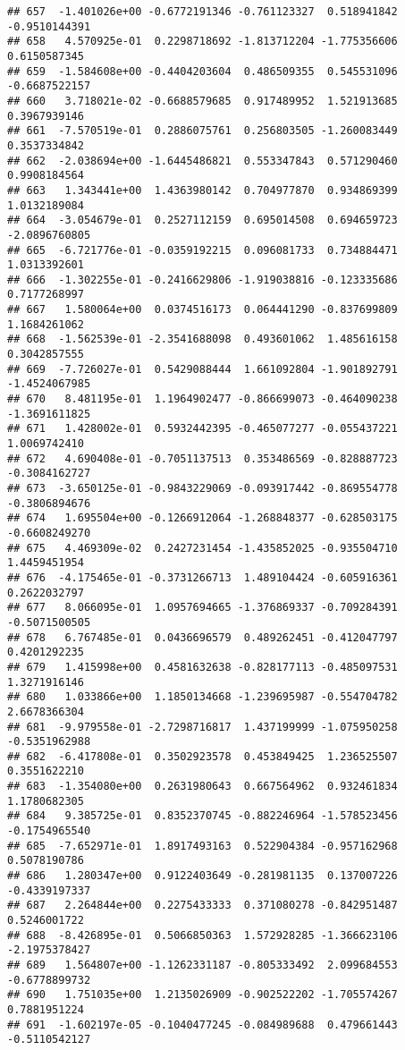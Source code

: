 \documentclass[
]{article}
\begin{document}
\begin{verbatim}
## 657  -1.401026e+00 -0.6772191346 -0.761123327  0.518941842 -0.9510144391
## 658   4.570925e-01  0.2298718692 -1.813712204 -1.775356606  0.6150587345
## 659  -1.584608e+00 -0.4404203604  0.486509355  0.545531096 -0.6687522157
## 660   3.718021e-02 -0.6688579685  0.917489952  1.521913685  0.3967939146
## 661  -7.570519e-01  0.2886075761  0.256803505 -1.260083449  0.3537334842
## 662  -2.038694e+00 -1.6445486821  0.553347843  0.571290460  0.9908184564
## 663   1.343441e+00  1.4363980142  0.704977870  0.934869399  1.0132189084
## 664  -3.054679e-01  0.2527112159  0.695014508  0.694659723 -2.0896760805
## 665  -6.721776e-01 -0.0359192215  0.096081733  0.734884471  1.0313392601
## 666  -1.302255e-01 -0.2416629806 -1.919038816 -0.123335686  0.7177268997
## 667   1.580064e+00  0.0374516173  0.064441290 -0.837699809  1.1684261062
## 668  -1.562539e-01 -2.3541688098  0.493601062  1.485616158  0.3042857555
## 669  -7.726027e-01  0.5429088444  1.661092804 -1.901892791 -1.4524067985
## 670   8.481195e-01  1.1964902477 -0.866699073 -0.464090238 -1.3691611825
## 671   1.428002e-01  0.5932442395 -0.465077277 -0.055437221  1.0069742410
## 672   4.690408e-01 -0.7051137513  0.353486569 -0.828887723 -0.3084162727
## 673  -3.650125e-01 -0.9843229069 -0.093917442 -0.869554778 -0.3806894676
## 674   1.695504e+00 -0.1266912064 -1.268848377 -0.628503175 -0.6608249270
## 675   4.469309e-02  0.2427231454 -1.435852025 -0.935504710  1.4459451954
## 676  -4.175465e-01 -0.3731266713  1.489104424 -0.605916361  0.2622032797
## 677   8.066095e-01  1.0957694665 -1.376869337 -0.709284391 -0.5071500505
## 678   6.767485e-01  0.0436696579  0.489262451 -0.412047797  0.4201292235
## 679   1.415998e+00  0.4581632638 -0.828177113 -0.485097531  1.3271916146
## 680   1.033866e+00  1.1850134668 -1.239695987 -0.554704782  2.6678366304
## 681  -9.979558e-01 -2.7298716817  1.437199999 -1.075950258 -0.5351962988
## 682  -6.417808e-01  0.3502923578  0.453849425  1.236525507  0.3551622210
## 683  -1.354080e+00  0.2631980643  0.667564962  0.932461834  1.1780682305
## 684   9.385725e-01  0.8352370745 -0.882246964 -1.578523456 -0.1754965540
## 685  -7.652971e-01  1.8917493163  0.522904384 -0.957162968  0.5078190786
## 686   1.280347e+00  0.9122403649 -0.281981135  0.137007226 -0.4339197337
## 687   2.264844e+00  0.2275433333  0.371080278 -0.842951487  0.5246001722
## 688  -8.426895e-01  0.5066850363  1.572928285 -1.366623106 -2.1975378427
## 689   1.564807e+00 -1.1262331187 -0.805333492  2.099684553 -0.6778899732
## 690   1.751035e+00  1.2135026909 -0.902522202 -1.705574267  0.7881951224
## 691  -1.602197e-05 -0.1040477245 -0.084989688  0.479661443 -0.5110542127

\end{verbatim}
\end{document}

